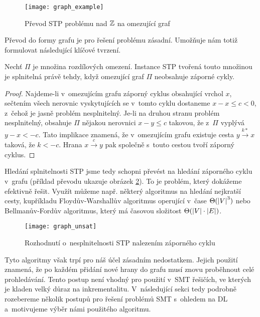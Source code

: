 \begin{figure}
	\centering
	\texttt{[image: graph\_example]}
	\caption{Převod STP problému nad $\mathbb{Z}$ na omezující graf}
	\label{fig:graph}
\end{figure}

Převod do formy grafu je pro řešení problému zásadní. Umožňuje nám totiž formulovat následující klíčové tvrzení.

\begin{tvrz}
	Nechť $\Pi$ je množina rozdílových omezení. Instance STP tvořená touto množinou je splnitelná právě tehdy, když omezující graf $\Pi$ neobsahuje záporné cykly.
\end{tvrz}
\begin{proof}
	Najdeme-li v~omezujícím grafu záporný cyklus obsahující vrchol $x$, sečtením všech nerovnic vyskytujících se v~tomto cyklu dostaneme $x-x \leq c < 0$, z~čehož je jasně problém nesplnitelný. Je-li na druhou stranu problém nesplnitelný, obsahuje $\Pi$ nějakou nerovnici $x - y \leq c$ takovou, že z~$\Pi$ vyplývá $y - x < -c$. Tato implikace znamená, že v~omezujícím grafu existuje cesta $y \xrightarrow{k*} x$ taková, že $k < -c$. Hrana $x \xrightarrow{c} y$ pak společně s~touto cestou tvoří záporný cyklus.
\end{proof}

Hledání splnitelnosti STP jsme tedy schopni převést na hledání záporného cyklu v~grafu (příklad převodu ukazuje obrázek \ref{fig:unsat}). To je problém, který dokážeme efektivně řešit. Využít můžeme např. některý algoritmus na hledání nejkratší cesty, kupříkladu Floydův-Warshallův algoritmus operující v~čase $\Theta(\left|{V}\right|^3)$ nebo Bellmanův-Fordův algoritmus, který má časovou složitost $\Theta(\left|{V}\right|\cdot\left|{E}\right|)$.

\begin{figure}
	\centering
	\texttt{[image: graph\_unsat]}
	\caption{Rozhodnutí o~nesplnitelnosti STP nalezením záporného cyklu}
	\label{fig:unsat}
\end{figure}

Tyto algoritmy však trpí pro náš účel zásadním nedostatkem. Jejich použití znamená, že po každém přidání nové hrany do grafu musí znovu proběhnout celé prohledávání. Tento postup není vhodný pro použití v~SMT řešičích, ve kterých je kladen velký důraz na inkrementalitu. V~následující sekci tedy podrobně rozebereme několik postupů pro řešení problémů SMT s~ohledem na DL a~motivujeme výběr námi použitého algoritmu. 

